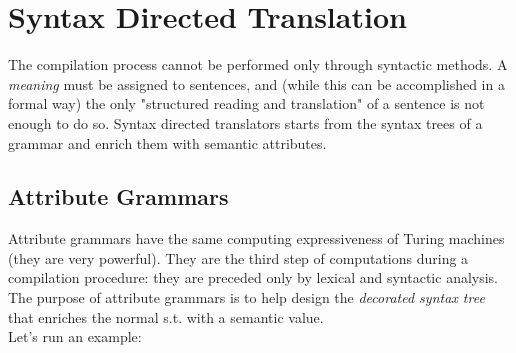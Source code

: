 \documentclass[10pt,a4paper]{article}
\begin{document}
		\section{Syntax Directed Translation}
		
			The compilation process cannot be performed only through syntactic methods. A \emph{meaning} must be assigned to sentences, and (while this can be accomplished in a formal way) the only "structured reading and translation" of a sentence is not enough to do so. Syntax directed translators starts from the syntax trees of a grammar and enrich them with semantic attributes. 
			
			\subsection{Attribute Grammars}
				Attribute grammars have the same computing expressiveness of Turing machines (they are very powerful). They are the third step of computations during a compilation procedure: they are preceded only by lexical and syntactic analysis. The purpose of attribute grammars is to help design the \emph{decorated syntax tree} that enriches the normal s.t. with a semantic value.\\
				Let's run an example:
				
\end{document}
